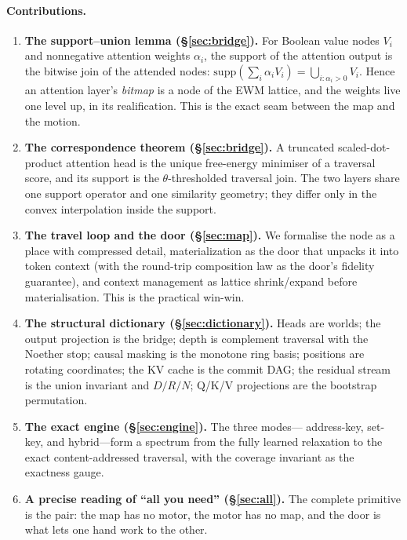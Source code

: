 \documentclass[11pt,a4paper]{article}
\theoremstyle{remark}
\newcommand{\supp}{\ensuremath{\mathrm{supp}}}         %
\begin{document}
\paragraph{Contributions.}
\begin{enumerate}[leftmargin=*,nosep]
  \item \textbf{The support--union lemma (\S\ref{sec:bridge}).} For Boolean
    value nodes $V_i$ and nonnegative attention weights $\alpha_i$, the support
    of the attention output is the bitwise join of the attended nodes:
    $\supp(\sum_i \alpha_i V_i)=\bigcup_{i:\alpha_i>0}V_i$. Hence an attention
    layer's \emph{bitmap} is a node of the EWM lattice, and the weights live one
    level up, in its realification. This is the exact seam between the map and
    the motion.
  \item \textbf{The correspondence theorem (\S\ref{sec:bridge}).} A truncated
    scaled-dot-product attention head is the unique free-energy minimiser of a
    traversal score, and its support is the $\theta$-thresholded traversal
    join. The two layers share one support operator and one similarity geometry;
    they differ only in the convex interpolation inside the support.
  \item \textbf{The travel loop and the door (\S\ref{sec:map}).} We formalise
    the node as a place with compressed detail, materialization as the door that
    unpacks it into token context (with the round-trip composition law as the
    door's fidelity guarantee), and context management as lattice shrink/expand
    before materialisation. This is the practical win-win.
  \item \textbf{The structural dictionary (\S\ref{sec:dictionary}).} Heads are
    worlds; the output projection is the bridge; depth is complement traversal
    with the Noether stop; causal masking is the monotone ring basis; positions
    are rotating coordinates; the KV cache is the commit DAG; the residual
    stream is the union invariant and $D/R/N$; Q/K/V projections are the
    bootstrap permutation.
  \item \textbf{The exact engine (\S\ref{sec:engine}).} The three modes---%
    address-key, set-key, and hybrid---form a spectrum from the fully learned
    relaxation to the exact content-addressed traversal, with the coverage
    invariant as the exactness gauge.
  \item \textbf{A precise reading of ``all you need'' (\S\ref{sec:all}).} The
    complete primitive is the pair: the map has no motor, the motor has no map,
    and the door is what lets one hand work to the other.
\end{enumerate}
\end{document}
